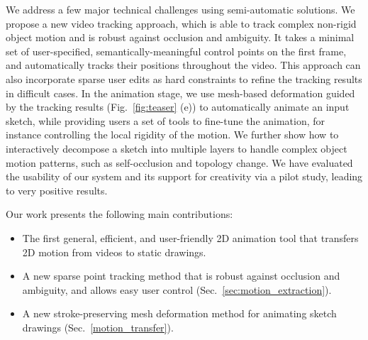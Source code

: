 We address a few major technical challenges using semi-automatic solutions. We  propose a new video tracking approach, which is able to track complex non-rigid object motion and is robust against occlusion and ambiguity. It takes a minimal set of user-specified, semantically-meaningful control points on the first frame, and automatically tracks their positions throughout the video. 
This approach can also incorporate sparse user edits as hard constraints to refine the tracking results in difficult cases. 
In the animation stage, we use mesh-based deformation guided by the tracking results (Fig.~\ref{fig:teaser} (e)) to automatically animate an input sketch, while providing users a set of tools to fine-tune the animation, for instance controlling the local rigidity of the motion. 
We further show how to interactively decompose a sketch into multiple layers to handle complex object motion patterns, such as self-occlusion and topology change. We have evaluated the usability of our system and its support for creativity via a pilot study, leading to very positive results.


Our work presents the following main contributions:
\begin{itemize}
\item The first general, efficient, and user-friendly 2D animation tool that transfers 2D motion from videos to static drawings.
\item A new sparse point tracking method that is robust against occlusion and ambiguity, and allows easy user control (Sec.~\ref{sec:motion_extraction}).
\item A new stroke-preserving mesh deformation method for animating sketch drawings (Sec.~\ref{motion_transfer}).
\end{itemize}
